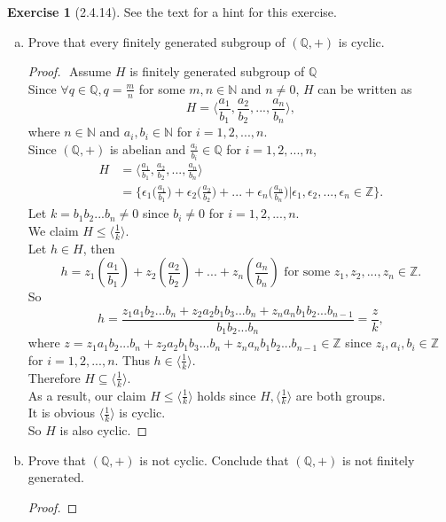 \documentclass{amsart}
\newcommand{\bbz}{\mathbb{Z}}
\newcommand{\bbq}{\mathbb{Q}}
\newcommand{\bbn}{\mathbb{N}}
\theoremstyle{plain}
\theoremstyle{definition}
\newtheorem{exer}[lem]{Exercise}
\begin{document}
\begin{exer}[2.4.14]
See the text for a hint for this exercise.
\begin{enumerate}[(a)]
\item Prove that every finitely generated subgroup of $(\bbq,+)$ is cyclic.
	\begin{proof}
		$ $\newline
		Assume $H$ is finitely generated subgroup of $\bbq$\\ 
		Since $\forall q \in \bbq, q = \frac{m}{n}$ for some $m,n\in \bbn$ and $n \neq 0$, $H$ can be written as 
		$$H = \Big\langle \frac{a_1}{b_1},\frac{a_2}{b_2},...,\frac{a_n}{b_n} \Big\rangle,$$ 
		where $n \in \bbn$ and $a_i,b_i \in \bbn $ for $i =1,2,...,n$. \\
		Since $(\bbq,+)$ is abelian and $\frac{a_i}{b_i} \in \bbq$ for $i = 1,2,...,n$, 
		\begin{align*}
			H &= \Big\langle \frac{a_1}{b_1},\frac{a_2}{b_2},...,\frac{a_n}{b_n} \Big\rangle \\
			  &= \Big\{\epsilon_1\big(\frac{a_1}{b_1}\big)+\epsilon_2\big(\frac{a_2}{b_2}\big) + ...+\epsilon_n\big(\frac{a_n}{b_n}\big)|\epsilon_1,\epsilon_2,...,\epsilon_n \in \bbz\Big\}. 
	    \end{align*}
		Let $k = b_1b_2...b_n \neq 0$ since $b_i \neq 0$ for $i =1,2,...,n$.\\
		We claim $H \leq \langle \frac{1}{k} \rangle$.\\
	    Let $h \in H$, then 
	    $$h = z_1(\frac{a_1}{b_1})+z_2(\frac{a_2}{b_2}) + ...+z_n(\frac{a_n}{b_n}) \text{ for some } z_1,z_2,...,z_n \in \bbz.$$
	    So 
	    $$h = \frac{z_1a_1b_2...b_n + z_2a_2b_1b_3...b_n + z_na_nb_1b_2...b_{n-1}}{b_1b_2...b_n} = \frac{z}{k},$$
	    where $z = z_1a_1b_2...b_n + z_2a_2b_1b_3...b_n + z_na_nb_1b_2...b_{n-1} \in \bbz$ since $z_i,a_i,b_i \in \bbz$ for $i = 1,2,...,n$.
	    Thus $h \in \langle \frac{1}{k} \rangle$.\\
	    Therefore $H \subseteq \langle \frac{1}{k} \rangle$.\\
	    As a result, our claim $H \leq \langle \frac{1}{k} \rangle$ holds since $H, \langle \frac{1}{k} \rangle $ are both groups.\\
	    It is obvious $\langle \frac{1}{k} \rangle$ is cyclic.\\
	    So $H$ is also cyclic.
	\end{proof}
\item Prove that $(\bbq,+)$ is not cyclic.
Conclude that $(\bbq,+)$ is not finitely generated.
	\begin{proof}

\end{proof}
\end{enumerate}
\end{exer}
\end{document}
